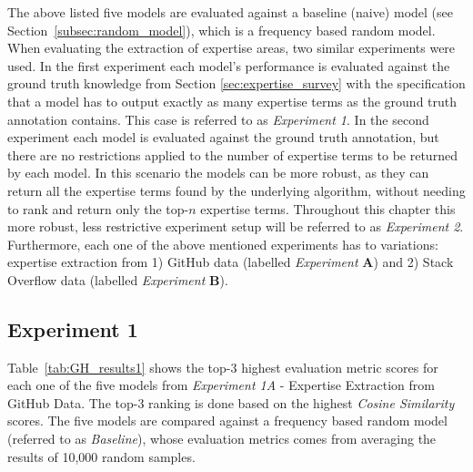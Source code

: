         The above listed five models are evaluated against a baseline (naive) model (see Section~\ref{subsec:random_model}), which is a frequency based random model. When evaluating the extraction of expertise areas, two similar experiments were used. In the first experiment each model's performance is evaluated against the ground truth knowledge from Section \ref{sec:expertise_survey} with the specification that a model has to output exactly as many expertise terms as the ground truth annotation contains. This case is referred to as \emph{Experiment 1}. In the second experiment each model is evaluated against the ground truth annotation, but there are no restrictions applied to the number of expertise terms to be returned by each model. In this scenario the models can be more robust, as they can return all the expertise terms found by the underlying algorithm, without needing to rank and return only the top-$n$ expertise terms. Throughout this chapter this more robust, less restrictive experiment setup will be referred to as \emph{Experiment 2}. Furthermore, each one of the above mentioned experiments has to variations: expertise extraction from 1) GitHub data (labelled \emph{Experiment} \textbf{A}) and 2) Stack Overflow data (labelled \emph{Experiment} \textbf{B}).
        
        \subsection{Experiment 1}
        
            Table~\ref{tab:GH_results1} shows the top-$3$ highest evaluation metric scores for each one of the five models from \emph{Experiment 1A} - Expertise Extraction from GitHub Data. The top-$3$ ranking is done based on the highest \emph{Cosine Similarity} scores. The five models are compared against a frequency based random model (referred to as \emph{Baseline}), whose evaluation metrics comes from averaging the results of 10,000 random samples.
            
